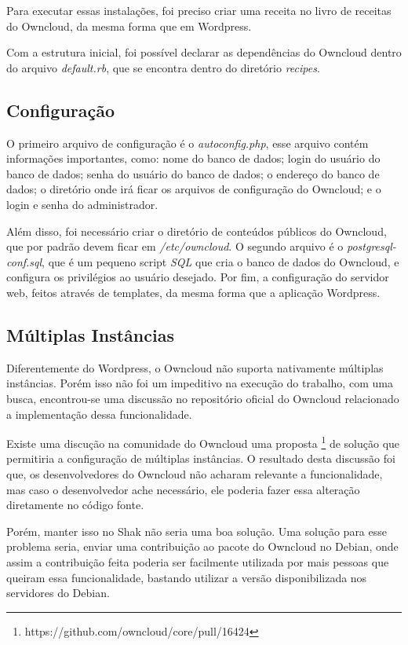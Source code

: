 Para executar essas instalações, foi preciso criar uma receita no livro de receitas
do Owncloud, da mesma forma que em Wordpress.

Com a estrutura inicial, foi possível declarar as dependências do Owncloud
dentro do arquivo \textit{default.rb}, que se encontra dentro do diretório 
\textit{recipes}.
 
\subsection{Configuração}

O primeiro arquivo de configuração é o \textit{autoconfig.php}, esse arquivo
contém informações importantes, como: nome do banco de dados;
login do usuário do banco de dados; senha do usuário do banco de dados; o endereço 
do banco de dados; o diretório
onde irá ficar os arquivos de configuração do Owncloud; e o login e senha
do administrador. 

Além disso, foi necessário criar o diretório de conteúdos públicos do Owncloud, que por
padrão devem ficar em \textit{/etc/owncloud}. O segundo arquivo é o 
\textit{postgresql-conf.sql}, que é um pequeno script \textit{SQL} que cria o 
banco de dados do Owncloud, e configura os
privilégios ao usuário desejado. Por fim, a configuração do servidor web, feitos
através de templates, da mesma forma que a aplicação Wordpress.

\subsection{Múltiplas Instâncias}

Diferentemente do Wordpress, o Owncloud não suporta nativamente múltiplas instâncias. 
Porém isso não foi um impeditivo na execução do trabalho, com uma busca, encontrou-se uma 
discussão no repositório oficial do Owncloud relacionado a implementação dessa 
funcionalidade. 

Existe uma discução na comunidade do Owncloud uma proposta \footnote{https://github.com/owncloud/core/pull/16424} 
de solução que permitiria a configuração de múltiplas instâncias. O
resultado desta discussão foi que, os desenvolvedores do Owncloud não acharam relevante
a funcionalidade, mas caso o desenvolvedor ache necessário, ele poderia fazer essa
alteração diretamente no código fonte.

Porém, manter isso no Shak não seria uma boa solução. Uma solução para esse problema seria, 
enviar uma contribuição ao pacote do Owncloud no Debian, onde assim a contribuição feita
poderia ser facilmente utilizada por mais pessoas que queiram essa funcionalidade,
bastando utilizar a versão disponibilizada nos servidores do Debian. 

